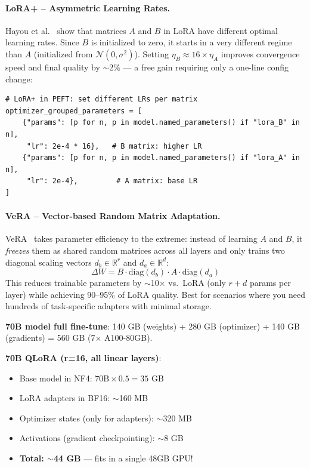 \newpage
\paragraph{LoRA+ -- Asymmetric Learning Rates.}
\label{lora-asymmetric-learning-rates.}

Hayou et al.~\cite{hayou2024loraplus} show that matrices $A$ and $B$ in LoRA have different optimal learning rates. Since $B$ is initialized to zero, it starts in a very different regime than $A$ (initialized from $\mathcal{N}(0, \sigma^2)$). Setting $\eta_B \approx 16 \times \eta_A$ improves convergence speed and final quality by $\sim$2\% --- a free gain requiring only a one-line config change:

\begin{lstlisting}[style=pythonstyle]
# LoRA+ in PEFT: set different LRs per matrix
optimizer_grouped_parameters = [
    {"params": [p for n, p in model.named_parameters() if "lora_B" in n],
     "lr": 2e-4 * 16},   # B matrix: higher LR
    {"params": [p for n, p in model.named_parameters() if "lora_A" in n],
     "lr": 2e-4},         # A matrix: base LR
]
\end{lstlisting}

\paragraph{VeRA -- Vector-based Random Matrix Adaptation.}
\label{vera-vector-based-random-matrix-adaptation.}

VeRA~\cite{kopiczko2024vera} takes parameter efficiency to the extreme: instead of learning $A$ and $B$, it \emph{freezes} them as shared random matrices across all layers and only trains two diagonal scaling vectors $d_b \in \mathbb{R}^r$ and $d_a \in \mathbb{R}^d$: 
\[
\Delta W = B \cdot \text{diag}(d_b) \cdot A \cdot \text{diag}(d_a)
\]
 This reduces trainable parameters by $\sim$10$\times$ vs.~LoRA (only $r + d$ params per layer) while achieving 90--95\% of LoRA quality. Best for scenarios where you need hundreds of task-specific adapters with minimal storage.

\begin{examplebox}
\textbf{70B model full fine-tune}: 140 GB (weights) + 280 GB (optimizer) + 140 GB (gradients) = 560 GB (7$\times$ A100-80GB).

\textbf{70B QLoRA (r=16, all linear layers)}:

\begin{itemize}
  \item Base model in NF4: $70\text{B} \times 0.5 = 35$ GB
  \item LoRA adapters in BF16: $\sim$160 MB
  \item Optimizer states (only for adapters): $\sim$320 MB
  \item Activations (gradient checkpointing): $\sim$8 GB
  \item \textbf{Total: $\sim$44 GB} --- fits in a single 48GB GPU!
\end{itemize}
\end{examplebox}

